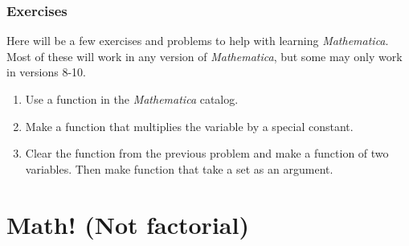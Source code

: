 \documentclass[11pt,a4paper,twoside]{article}
\begin{document}
%				
%				
%						
%					
%						
%					
%						
%					
%						
%					
%						
%					
%				
			
		\section{Exercises}
		
			Here will be a few exercises and problems to help with learning \textit{Mathematica}.  Most of these will work in any version of \textit{Mathematica}, but some may only work in versions 8-10.
			
			\begin{enumerate}
			
				\item %
				
					Use a function in the \textit{Mathematica} catalog.
					
				\item %
				
					Make a function that multiplies the variable by a special constant.
					
				\item %
				
					Clear the function from the previous problem and make a function of two variables.  Then make function that take a set as an argument.
			
			\end{enumerate}
			
\newpage
						
	\part{Math! (Not factorial) }
		
\end{document}
